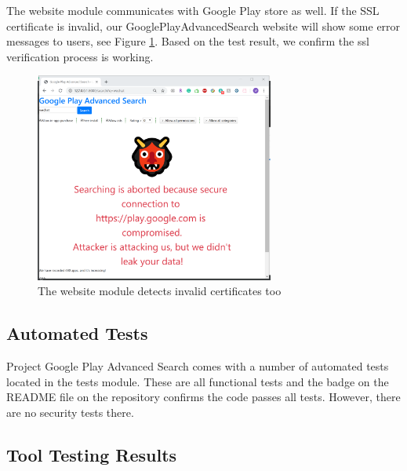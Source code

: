 \documentclass[12pt, a4paper]{article}
\begin{document}
The website module communicates with Google Play store as well. If the SSL certificate is invalid, our GooglePlayAdvancedSearch website will show some error messages to users, see Figure \ref{fig:ssl-test-on-website}. Based on the test result, we confirm the ssl verification process is working.


\begin{figure}[ht]
\centering
\includegraphics[width=0.7\textwidth]{ssl_test3.png}
\caption{The website module detects invalid certificates too}
\label{fig:ssl-test-on-website}
\end{figure}







\subsection{Automated Tests}
Project Google Play Advanced Search comes with a number of automated tests located in the tests module. These are all functional tests and the badge on the README file on the repository confirms the code passes all tests. However, there are no security tests there.

\subsection{Tool Testing Results}
\end{document}
